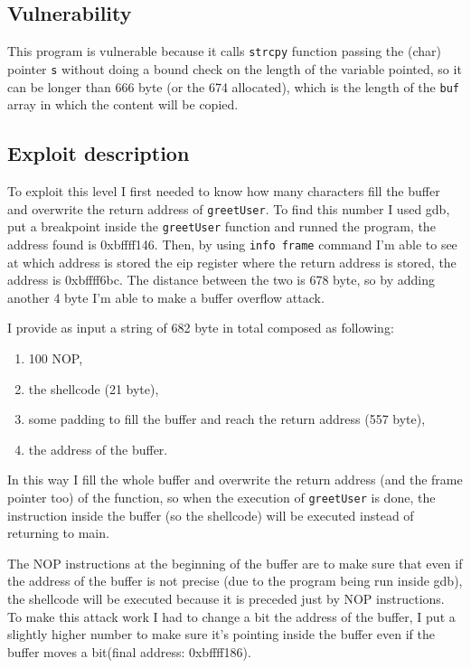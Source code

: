 \documentclass[a4paper,12pt]{article}
\begin{document}
\subsection{Vulnerability}

This program is vulnerable because it calls \texttt{strcpy} function passing the (char) pointer \texttt{s} without doing a bound check on the length of the variable pointed, so it can be longer than 666 byte (or the 674 allocated), which is the length of the \texttt{buf} array in which the content will be copied.

\subsection{Exploit description}

To exploit this level I first needed to know how many characters fill the buffer and overwrite the return address of \texttt{greetUser}. To find this number I used gdb, put a breakpoint inside the \texttt{greetUser} function and runned the program, the address found is 0xbffff146. Then, by using \texttt{info frame} command I'm able to see at which address is stored the eip register where the return address is stored, the address is 0xbffff6bc. The distance between the two is 678 byte, so by adding another 4 byte I'm able to make a buffer overflow attack.

I provide as input a string of 682 byte in total composed as following:
\begin{enumerate}
\item 100 NOP,
\item the shellcode (21 byte),
\item some padding to fill the buffer and reach the return address (557 byte),
\item the address of the buffer.
\end{enumerate}


In this way I fill the whole buffer and overwrite the return address (and the frame pointer too) of the function, so when the execution of \texttt{greetUser} is done, the instruction inside the buffer (so the shellcode) will be executed instead of returning to main. 

The NOP instructions at the beginning of the buffer are to make sure that even if the address of the buffer is not precise (due to the program being run inside gdb), the shellcode will be executed because it is preceded just by NOP instructions. To make this attack work I had to change a bit the address of the buffer, I put a slightly higher number to make sure it's pointing inside the buffer even if the buffer moves a bit(final address: 0xbffff186).
\end{document}
